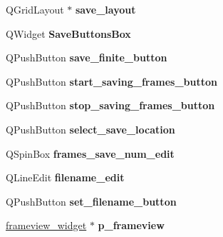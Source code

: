 \begin{DoxyCompactItemize}
\item 
\hypertarget{classControlsBox_a1922bf2df397cefaf336c43b97d7b7bb}{Q\+Grid\+Layout $\ast$ {\bfseries save\+\_\+layout}}\label{classControlsBox_a1922bf2df397cefaf336c43b97d7b7bb}

\item 
\hypertarget{classControlsBox_aac08d47d52e50143a11762e1ea7c5955}{Q\+Widget {\bfseries Save\+Buttons\+Box}}\label{classControlsBox_aac08d47d52e50143a11762e1ea7c5955}

\item 
\hypertarget{classControlsBox_a0f793a1b00a783bf4000ca75f699afc3}{Q\+Push\+Button {\bfseries save\+\_\+finite\+\_\+button}}\label{classControlsBox_a0f793a1b00a783bf4000ca75f699afc3}

\item 
\hypertarget{classControlsBox_ab75b3ea023086a9e6f3986307b74c089}{Q\+Push\+Button {\bfseries start\+\_\+saving\+\_\+frames\+\_\+button}}\label{classControlsBox_ab75b3ea023086a9e6f3986307b74c089}

\item 
\hypertarget{classControlsBox_a7297ec95e7ad47527068d908892866ff}{Q\+Push\+Button {\bfseries stop\+\_\+saving\+\_\+frames\+\_\+button}}\label{classControlsBox_a7297ec95e7ad47527068d908892866ff}

\item 
\hypertarget{classControlsBox_a11ec9d943dcebc679a513b556a29f9ba}{Q\+Push\+Button {\bfseries select\+\_\+save\+\_\+location}}\label{classControlsBox_a11ec9d943dcebc679a513b556a29f9ba}

\item 
\hypertarget{classControlsBox_a2cee6fb0729f397f875a6b3b50814d3a}{Q\+Spin\+Box {\bfseries frames\+\_\+save\+\_\+num\+\_\+edit}}\label{classControlsBox_a2cee6fb0729f397f875a6b3b50814d3a}

\item 
\hypertarget{classControlsBox_abf9afe1c136775ae55dbb41179b2dc0a}{Q\+Line\+Edit {\bfseries filename\+\_\+edit}}\label{classControlsBox_abf9afe1c136775ae55dbb41179b2dc0a}

\item 
\hypertarget{classControlsBox_a6554680f420e65d6d83b506dfc58f856}{Q\+Push\+Button {\bfseries set\+\_\+filename\+\_\+button}}\label{classControlsBox_a6554680f420e65d6d83b506dfc58f856}

\item 
\hypertarget{classControlsBox_a4d69022df75b23653f70327c2fea5fdc}{\hyperlink{classframeview__widget}{frameview\+\_\+widget} $\ast$ {\bfseries p\+\_\+frameview}}\label{classControlsBox_a4d69022df75b23653f70327c2fea5fdc}


\end{DoxyCompactItemize}
